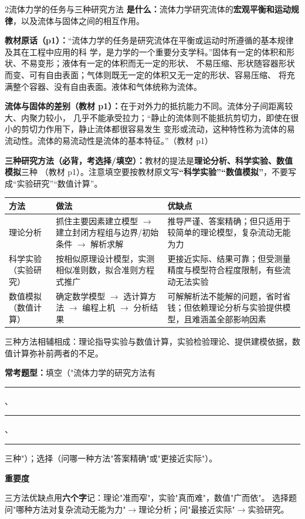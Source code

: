 \begin{kaodian}{2}{流体力学的任务与三种研究方法}
\textbf{是什么：}流体力学研究流体的\textbf{宏观平衡和运动规律}，以及流体与固体之间的相互作用。

\textbf{教材原话（p1）：}“流体力学的任务是研究流体在平衡或运动时所遵循的基本规律及其在工程中应用的科
学，是力学的一个重要分支学科。”固体有一定的体积和形状、不易变形；液体有一定的体积而无一定的形状、
不易压缩、形状随容器形状而变、可有自由表面；气体则既无一定的体积又无一定的形状、容易压缩、
将充满整个容器、没有自由表面。液体和气体统称为流体。

\textbf{流体与固体的差别（教材 p1）：}在于对外力的抵抗能力不同。流体分子间距离较大、内聚力较小，
几乎不能承受拉力；“静止的流体则不能抵抗剪切力，即使在很小的剪切力作用下，静止流体都很容易发生
变形或流动，这种特性称为流体的易流动性。流体的易流动性是流体的基本特征。”（教材 p1）

\textbf{三种研究方法（必背，考选择/填空）：}教材的提法是\textbf{理论分析、科学实验、数值模拟}三种
（教材 p1）。注意填空要按教材原文写\textbf{“科学实验”“数值模拟”}，不要写成“实验研究”“数值计算”。
\begin{center}
\begin{tabularx}{\textwidth}{@{}lXX@{}}
\toprule
方法 & 做法 & 优缺点 \\
\midrule
理论分析 & 抓住主要因素建立模型 $\to$ 建立封闭方程组与边界/初始条件 $\to$ 解析求解 & 推导严谨、答案精确；但只适用于较简单的理论模型，复杂流动无能为力 \\
科学实验（实验研究） & 按相似原理设计模型，实测相似准则数，拟合准则方程式推广 & 更接近实际、结果可靠；但受测量精度与模型符合程度限制，有些流动无法实验 \\
数值模拟（数值计算） & 确定数学模型 $\to$ 选计算方法 $\to$ 编程上机 $\to$ 分析结果 & 可解解析法不能解的问题，省时省钱；但依赖理论分析与实验提供模型，且难涵盖全部影响因素 \\
\bottomrule
\end{tabularx}
\end{center}
三种方法相辅相成：理论指导实验与数值计算，实验检验理论、提供建模依据，数值计算弥补前两者的不足。

\textbf{常考题型：}填空（"流体力学的研究方法有\rule{2cm}{0.4pt}、\rule{2cm}{0.4pt}、\rule{2cm}{0.4pt}三种"）；选择（问哪一种方法"答案精确"或"更接近实际"）。

\textbf{重要度 }\quad{}\quad{}

\begin{banfa}
三方法优缺点用\textbf{六个字}记：理论"准而窄"，实验"真而难"，数值"广而依"。
选择题问"哪种方法对复杂流动无能为力"$\to$理论分析；问"最接近实际"$\to$实验研究。
\end{banfa}
\end{kaodian}

